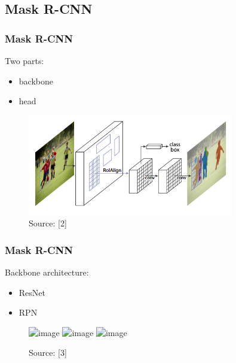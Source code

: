 \documentclass{beamer}
\begin{document}

\subsection{Mask R-CNN}

\begin{frame}

\frametitle{Mask R-CNN}

Two parts:
\begin{itemize}
	\item backbone
	\item head
\end{itemize}

\begin{figure}[ht]
	\includegraphics[width=0.8\textwidth]{pictures/maskrcnn.png}
	\caption{Source: [2]}
\end{figure}

\end{frame}


\iffalse

\begin{frame}

\frametitle{Mask R-CNN}

Backbone architecture:
\begin{itemize}
	\item ResNet
	\item<2-> RPN
\end{itemize}

\begin{figure}[ht]
	\includegraphics<1>[width=0.5\textwidth]{pictures/bottleneck-block.jpg}
	\includegraphics<2>[width=0.5\textwidth]{pictures/fasterrcnn.png}
	\includegraphics<3>[width=0.5\textwidth]{pictures/fasterrcnn-anchors.png}
	\caption{Source: [3]}
\end{figure}

\end{frame}
\end{document}
